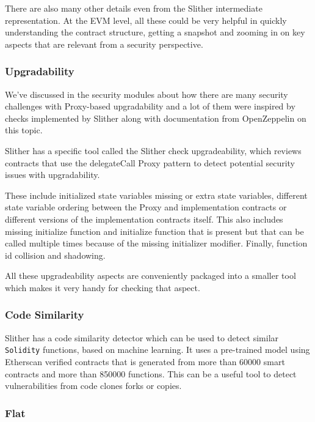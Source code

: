 There are also many other details even from the Slither intermediate
representation. At the EVM level, all these could be very helpful in
quickly understanding the contract structure, getting a snapshot and
zooming in on key aspects that are relevant from a security perspective.

\subsubsection{Upgradability}\label{upgradability}

We've discussed in the security modules about how there are many
security challenges with Proxy-based upgradability and a lot of them
were inspired by checks implemented by Slither along with documentation
from OpenZeppelin on this topic.

Slither has a specific tool called the Slither check upgradeability,
which reviews contracts that use the delegateCall Proxy pattern to
detect potential security issues with upgradability.

These include initialized state variables missing or extra state
variables, different state variable ordering between the Proxy and
implementation contracts or different versions of the implementation
contracts itself. This also includes missing initialize function and
initialize function that is present but that can be called multiple
times because of the missing initializer modifier. Finally, function id
collision and shadowing.

All these upgradeability aspects are conveniently packaged into a
smaller tool which makes it very handy for checking that aspect.

\subsubsection{Code Similarity}\label{code-similarity}

Slither has a code similarity detector which can be used to detect
similar \texttt{Solidity} functions, based on machine learning. It uses
a pre-trained model using Etherscan verified contracts that is generated
from more than 60000 smart contracts and more than 850000 functions.
This can be a useful tool to detect vulnerabilities from code clones
forks or copies.

\subsubsection{Flat}\label{flat}

